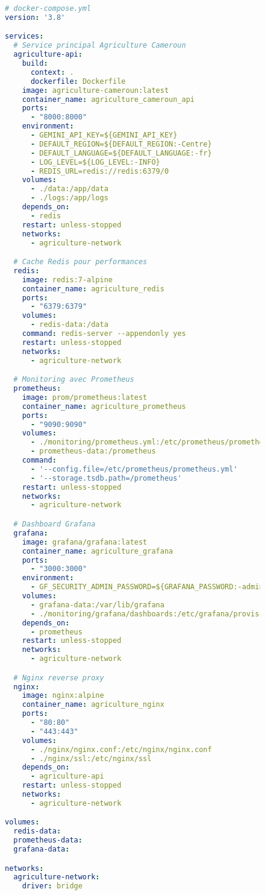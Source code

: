 \begin{figure}[h]
\centering
\begin{lstlisting}[language=yaml, caption=Docker Compose pour environnement complet]
# docker-compose.yml
version: '3.8'

services:
  # Service principal Agriculture Cameroun
  agriculture-api:
    build:
      context: .
      dockerfile: Dockerfile
    image: agriculture-cameroun:latest
    container_name: agriculture_cameroun_api
    ports:
      - "8000:8000"
    environment:
      - GEMINI_API_KEY=${GEMINI_API_KEY}
      - DEFAULT_REGION=${DEFAULT_REGION:-Centre}
      - DEFAULT_LANGUAGE=${DEFAULT_LANGUAGE:-fr}
      - LOG_LEVEL=${LOG_LEVEL:-INFO}
      - REDIS_URL=redis://redis:6379/0
    volumes:
      - ./data:/app/data
      - ./logs:/app/logs
    depends_on:
      - redis
    restart: unless-stopped
    networks:
      - agriculture-network

  # Cache Redis pour performances
  redis:
    image: redis:7-alpine
    container_name: agriculture_redis
    ports:
      - "6379:6379"
    volumes:
      - redis-data:/data
    command: redis-server --appendonly yes
    restart: unless-stopped
    networks:
      - agriculture-network

  # Monitoring avec Prometheus
  prometheus:
    image: prom/prometheus:latest
    container_name: agriculture_prometheus
    ports:
      - "9090:9090"
    volumes:
      - ./monitoring/prometheus.yml:/etc/prometheus/prometheus.yml
      - prometheus-data:/prometheus
    command:
      - '--config.file=/etc/prometheus/prometheus.yml'
      - '--storage.tsdb.path=/prometheus'
    restart: unless-stopped
    networks:
      - agriculture-network

  # Dashboard Grafana
  grafana:
    image: grafana/grafana:latest
    container_name: agriculture_grafana
    ports:
      - "3000:3000"
    environment:
      - GF_SECURITY_ADMIN_PASSWORD=${GRAFANA_PASSWORD:-admin}
    volumes:
      - grafana-data:/var/lib/grafana
      - ./monitoring/grafana/dashboards:/etc/grafana/provisioning/dashboards
    depends_on:
      - prometheus
    restart: unless-stopped
    networks:
      - agriculture-network

  # Nginx reverse proxy
  nginx:
    image: nginx:alpine
    container_name: agriculture_nginx
    ports:
      - "80:80"
      - "443:443"
    volumes:
      - ./nginx/nginx.conf:/etc/nginx/nginx.conf
      - ./nginx/ssl:/etc/nginx/ssl
    depends_on:
      - agriculture-api
    restart: unless-stopped
    networks:
      - agriculture-network

volumes:
  redis-data:
  prometheus-data:
  grafana-data:

networks:
  agriculture-network:
    driver: bridge
\end{lstlisting}
\end{figure}

